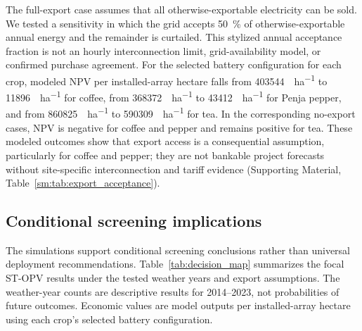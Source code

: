 The full-export case assumes that all otherwise-exportable electricity can be sold. We tested a sensitivity in which the grid accepts \qty{50}{\percent} of otherwise-exportable annual energy and the remainder is curtailed. This stylized annual acceptance fraction is not an hourly interconnection limit, grid-availability model, or confirmed purchase agreement. For the selected battery configuration for each crop, modeled NPV per installed-array hectare falls from \qty{403544}{\USD\per\hectare} to \qty{11896}{\USD\per\hectare} for coffee, from \qty{368372}{\USD\per\hectare} to \qty{43412}{\USD\per\hectare} for Penja pepper, and from \qty{860825}{\USD\per\hectare} to \qty{590309}{\USD\per\hectare} for tea. In the corresponding no-export cases, NPV is negative for coffee and pepper and remains positive for tea. These modeled outcomes show that export access is a consequential assumption, particularly for coffee and pepper; they are not bankable project forecasts without site-specific interconnection and tariff evidence (Supporting Material, Table~\cref{sm:tab:export_acceptance}).

\subsection{Conditional screening implications}
\label{sec:decision_map}

The simulations support conditional screening conclusions rather than universal deployment recommendations. Table~\ref{tab:decision_map} summarizes the focal ST-OPV results under the tested weather years and export assumptions. The weather-year counts are descriptive results for 2014--2023, not probabilities of future outcomes. Economic values are model outputs per installed-array hectare using each crop's selected battery configuration.

